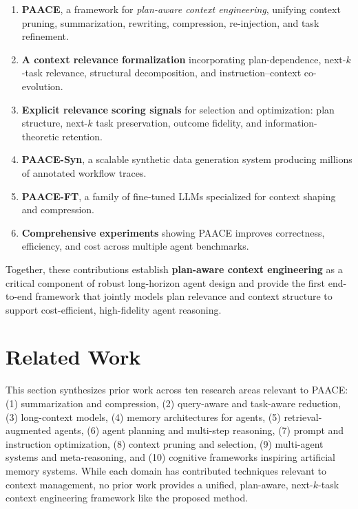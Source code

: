 \documentclass{article}
\theoremstyle{plain}
\theoremstyle{definition}
\theoremstyle{remark}
\begin{document}
\begin{enumerate}[topsep=0pt,itemsep=1pt,parsep=0pt,partopsep=0pt]
    \item \textbf{PAACE}, a framework for \emph{plan-aware context engineering}, unifying context pruning, summarization, rewriting, compression, re-injection, and task refinement.
    \item \textbf{A context relevance formalization} incorporating plan-dependence, next-$k$-task relevance, structural decomposition, and instruction--context co-evolution.
    \item \textbf{Explicit relevance scoring signals} for selection and optimization: plan structure, next-$k$ task preservation, outcome fidelity, and information-theoretic retention.
    \item \textbf{PAACE-Syn}, a scalable synthetic data generation system producing millions of annotated workflow traces.
    \item \textbf{PAACE-FT}, a family of fine-tuned LLMs specialized for context shaping and compression.
    \item \textbf{Comprehensive experiments} showing PAACE improves correctness, efficiency, and cost across multiple agent benchmarks.
\end{enumerate}




Together, these contributions establish \textbf{plan-aware context engineering} as a critical component of robust long-horizon agent design and provide the first end-to-end framework that jointly models plan relevance and context structure to support cost-efficient, high-fidelity agent reasoning.

\section{Related Work}
\label{sec:related}

This section synthesizes prior work across ten research areas relevant to
PAACE:
(1) summarization and compression,
(2) query-aware and task-aware reduction,
(3) long-context models,
(4) memory architectures for agents,
(5) retrieval-augmented agents,
(6) agent planning and multi-step reasoning,
(7) prompt and instruction optimization,
(8) context pruning and selection,
(9) multi-agent systems and meta-reasoning,
and (10) cognitive frameworks inspiring artificial memory systems. While each domain has contributed techniques relevant to context management,
no prior work provides a unified, plan-aware, next-$k$-task context engineering
framework like the proposed method.
\end{document}
